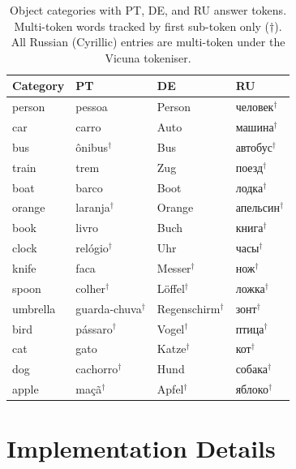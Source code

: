 \documentclass[11pt]{article}
\newcommand{\ru}[1]{{\fontencoding{T2A}\fontfamily{cmr}\selectfont #1}}
\begin{document}
\begin{table}[h]
\centering
\footnotesize
\setlength{\tabcolsep}{4pt}
\caption{
  Object categories with PT, DE, and RU answer tokens.
  Multi-token words tracked by first sub-token only ($\dagger$).
  All Russian (Cyrillic) entries are multi-token under the Vicuna tokeniser.
}
\label{tab:probing_categories}
\begin{tabular}{llll}
\toprule
\textbf{Category} & \textbf{PT} & \textbf{DE} & \textbf{RU} \\
\midrule
person   & pessoa              & Person              & \ru{человек}$^\dagger$ \\
car      & carro               & Auto                & \ru{машина}$^\dagger$ \\
bus      & \^{o}nibus$^\dagger$ & Bus                & \ru{автобус}$^\dagger$ \\
train    & trem                & Zug                 & \ru{поезд}$^\dagger$ \\
boat     & barco               & Boot                & \ru{лодка}$^\dagger$ \\
orange   & laranja$^\dagger$   & Orange              & \ru{апельсин}$^\dagger$ \\
book     & livro               & Buch                & \ru{книга}$^\dagger$ \\
clock    & rel\'ogio$^\dagger$ & Uhr                 & \ru{часы}$^\dagger$ \\
knife    & faca                & Messer$^\dagger$    & \ru{нож}$^\dagger$ \\
spoon    & colher$^\dagger$    & L\"offel$^\dagger$  & \ru{ложка}$^\dagger$ \\
umbrella & guarda-chuva$^\dagger$ & Regenschirm$^\dagger$ & \ru{зонт}$^\dagger$ \\
bird     & p\'assaro$^\dagger$ & Vogel$^\dagger$     & \ru{птица}$^\dagger$ \\
cat      & gato                & Katze$^\dagger$     & \ru{кот}$^\dagger$ \\
dog      & cachorro$^\dagger$  & Hund                & \ru{собака}$^\dagger$ \\
apple    & ma\c{c}\~a$^\dagger$ & Apfel$^\dagger$   & \ru{яблоко}$^\dagger$ \\
\bottomrule
\end{tabular}
\end{table}

\section{Implementation Details}
\label{app:patching}
\end{document}
